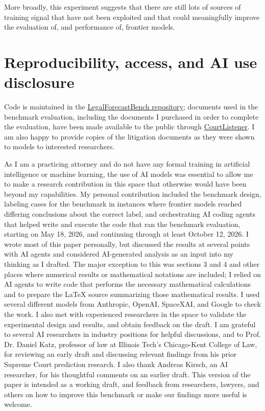 \documentclass[11pt]{article}
\begin{document}
More broadly, this experiment suggests that there are still lots of sources of training signal that have not been exploited and that could meaningfully improve the evaluation of, and performance of, frontier models. 

\section*{Reproducibility, access, and AI use disclosure}
Code is maintained in the \href{https://github.com/johnhughes3/LegalForecastBench}{LegalForecastBench repository}; documents used in the benchmark evaluation, including the documents I purchased in order to complete the evaluation, have been made available to the public through \href{https://www.courtlistener.com/}{CourtListener}. I am also happy to provide copies of the litigation documents as they were shown to models to interested researchers.

As I am a practicing attorney and do not have any formal training in artificial intelligence or machine learning, the use of AI models was essential to allow me to make a research contribution in this space that otherwise would have been beyond my capabilities. My personal contribution included the benchmark design, labeling cases for the benchmark in instances where frontier models reached differing conclusions about the correct label, and orchestrating AI coding agents that helped write and execute the code that ran the benchmark evaluation, starting on May 18, 2026, and continuing through at least October 12, 2026. I wrote most of this paper personally, but discussed the results at several points with AI agents and considered AI-generated analysis as an input into my thinking as I drafted. The major exception to this was sections 3 and 4 and other places where numerical results or mathematical notations are included; I relied on AI agents to write code that performs the necessary mathematical calculations and to prepare the LaTeX source summarizing those mathematical results. I used several different models from Anthropic, OpenAI, SpaceXAI, and Google to check the work. I also met with experienced researchers in the space to validate the experimental design and results, and obtain feedback on the draft. I am grateful to several AI researchers in industry positions for helpful discussions, and to Prof. Dr. Daniel Katz, professor of law at Illinois Tech's Chicago-Kent College of Law, for reviewing an early draft and discussing relevant findings from his prior Supreme Court prediction research. I also thank Andreas Kirsch, an AI researcher, for his thoughtful comments on an earlier draft. This version of the paper is intended as a working draft, and feedback from researchers, lawyers, and others on how to improve this benchmark or make our findings more useful is welcome.
\end{document}
